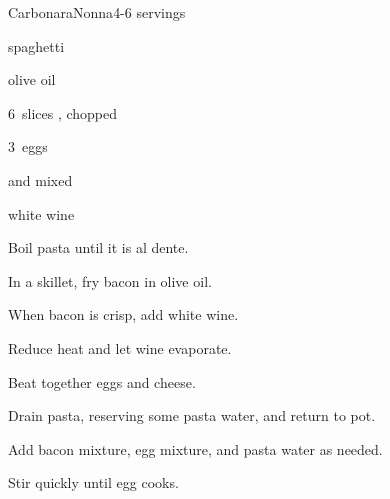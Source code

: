 \begin{recipe}{Carbonara}{Nonna}{4-6 servings}

\begin{ingredients}
\item {} spaghetti
\item {} olive oil
\item 6~slices , chopped
\item 3~eggs
\item \C{\twothird}  and  mixed
\item \C{\half} white wine
\end{ingredients}

\begin{directions}
\item Boil pasta until it is al dente.
\item In a skillet, fry bacon in olive oil.
\item When bacon is crisp, add white wine.
\item Reduce heat and let wine evaporate.
\item Beat together eggs and cheese.
\item Drain pasta, reserving some pasta water, and return to pot.
\item Add bacon mixture, egg mixture, and pasta water as needed.
\item Stir quickly until egg cooks.
\end{directions}

\end{recipe}
